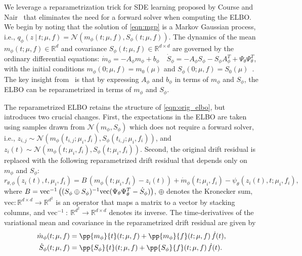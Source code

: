 \documentclass{article}
\begin{document}
	We leverage a reparametrization trick for SDE learning proposed by Course and Nair~\cite{Course_2023_State_Estimation} that eliminates the need for a forward solver when computing the ELBO. We begin by noting that the solution of \eqref{eqn:mgp} is a Markov Gaussian process, i.e., $q_\phi(z\ |\ t; \mu, f ) = \mathcal{N}(m_\phi(t; \mu, f), S_\phi(t; \mu, f))$. The dynamics of the mean $m_\phi(t;\mu,f) \in \mathbb{R}^d$ and covariance $S_\phi(t;\mu,f) \in \mathbb{R}^{d \times d}$ are governed by the ordinary differential equations: $\dot{m}_\phi = -A_\phi m_\phi + b_\phi$~~$\dot{S}_\phi = -A_\phi S_\phi - S_\phi A_\phi^T + \Psi_\theta \Psi_\theta^T$, with the initial conditions $m_\phi(0; \mu, f) = m_0(\mu)$ and $S_\phi(0; \mu, f) = S_0(\mu)$~\cite{sarkka2019book}. The key insight from~\cite{Course_2023_State_Estimation} is that by expressing $A_\phi$ and $b_\phi$ in terms of $m_\phi$ and $S_\phi$, the ELBO can be reparametrized in terms of $m_\phi$ and $S_\phi$. 
	
	The reparametrized ELBO retains the structure of \eqref{eqn:orig_elbo}, but introduces two crucial changes. First, the expectations in the ELBO are taken using samples drawn from $\mathcal{N}(m_\phi, S_\phi)$ which does not require a forward solver, i.e., $z_{i,j} \sim \mathcal{N} ( m_\phi(t_{i,j}; \mu_i, f_i), S_\phi (t_{i,j}; \mu_i, f_i) )$, and $z_i(t) \sim \mathcal{N} ( m_\phi(t; \mu_i, f_i), S_\phi (t; \mu_i, f_i) )$. Second, the original drift residual is replaced with the following reparametrized drift residual that depends only on $m_\phi$ and $S_\phi$:
	\begin{equation} \label{eqn:reparam_driftresidual}
		r_{\theta, \phi}(z_i(t), t, \mu_i, f_i) = B \, (m_\phi(t; \mu_i, f_i) - z_i(t)) + \dot{m}_\phi(t; \mu_i, f_i) - 
		\psi_{\theta}(z_i(t),t;\mu_i,f_i),
	\end{equation}
	where $B = {\rm vec}^{-1}\left((S_\phi \oplus S_\phi)^{-1} {\rm vec}(\Psi_\theta \Psi^T_\theta - \dot{S}_\phi )\right)$, $\oplus$ denotes the Kronecker sum, $\mathrm{vec}: \mathbb{R}^{d\times d} \rightarrow \mathbb{R}^{d^2}$ is an operator that maps a matrix to a vector by stacking columns, and $\mathrm{vec}^{-1}\ :\ \mathbb{R}^{d^2} \rightarrow \mathbb{R}^{d \times d}$ denotes its inverse. The time-derivatives of the variational mean and covariance in the reparametrized drift residual are given by
	\begin{equation} \label{eqn:ms_chain}
		\begin{aligned}
			\dot{m}_\phi(t; \mu, f) & = \pp{m_\phi}{t}(t; \mu, f) + \pp{m_\phi}{f}(t; \mu, f) \, \dot{f}(t),\\
			\dot{S}_\phi(t; \mu, f) & = \pp{S_\phi}{t}(t; \mu, f) + \pp{S_\phi}{f}(t; \mu, f) \, \dot{f}(t).
		\end{aligned}
	\end{equation}
	
\end{document}
